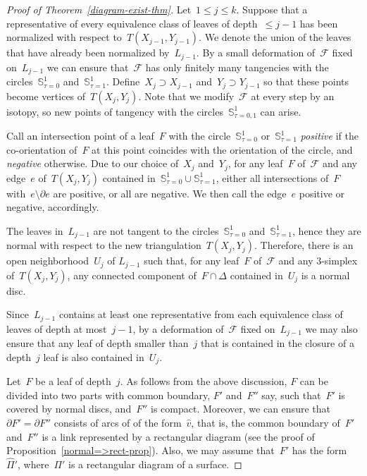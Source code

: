 \documentclass{amsart}
\theoremstyle{theorem}
\theoremstyle{remark}
\theoremstyle{definition}
\numberwithin{equation}{section}
\numberwithin{figure}{section}
\begin{document}
\begin{proof}[Proof of Theorem~\ref{diagram-exist-thm}]
Let~$1\leqslant j\leqslant k$.
Suppose that a representative of every equivalence class of leaves of depth~$\leqslant j-1$
has been normalized with respect to~$T(X_{j-1},Y_{j-1})$. We denote the union of the leaves
that have already been normalized
by~$L_{j-1}$. By a small deformation of~$\mathscr F$ fixed on~$L_{j-1}$ we can ensure
that~$\mathscr F$ has only finitely many tangencies with the circles~$\mathbb S^1_{\tau=0}$
and~$\mathbb S^1_{\tau=1}$. Define~$X_j\supset X_{j-1}$ and~$Y_j\supset Y_{j-1}$ so that these
points become vertices of~$T(X_j,Y_j)$. Note that we modify~$\mathscr F$ at every step by an isotopy,
so new points of tangency with the circles~$\mathbb S^1_{\tau=0,1}$ can arise.

Call an intersection point of a leaf~$F$ with the circle~$\mathbb S^1_{\tau=0}$ or~$\mathbb S^1_{\tau=1}$
\emph{positive} if the co-orientation of~$F$ at this point coincides
with the orientation of the circle, and \emph{negative} otherwise. Due to our choice of~$X_j$ and~$Y_j$,
for any leaf~$F$ of~$\mathscr F$ and any edge~$e$ of~$T(X_j,Y_j)$
contained in~$\mathbb S^1_{\tau=0}\cup\mathbb S^1_{\tau=1}$, either all intersections of~$F$ with~$e\setminus\partial e$ are positive, or all are negative. We then call the edge~$e$ positive or negative, accordingly.

The leaves in~$L_{j-1}$ are not tangent to the circles~$\mathbb S^1_{\tau=0}$ and~$\mathbb S^1_{\tau=1}$,
hence they are normal with respect to the new triangulation~$T(X_j,Y_j)$. Therefore,
there is an open neighborhood~$U_j$
of $L_{j-1}$ such that, for any leaf~$F$ of~$\mathscr F$
and any $3$-simplex of~$T(X_j,Y_j)$, any connected component of~$F\cap\Delta$ contained in~$U_j$
is a normal disc.

Since~$L_{j-1}$ contains at least one representative from each equivalence class of leaves of
depth at most~$j-1$, by a deformation of~$\mathscr F$ fixed on~$L_{j-1}$ we may also ensure that any leaf of depth smaller
than~$j$ that is contained in the closure of a depth~$j$ leaf is also contained in~$U_j$.

Let~$F$ be a leaf of depth~$j$. As follows from the above discussion, $F$ can be divided into
two parts with common boundary, $F'$ and~$F''$ say,
such that~$F'$ is covered by normal discs, and~$F''$ is compact. Moreover,
we can ensure that~$\partial F'=\partial F''$
consists of arcs of of the form~$\widehat v$, that is, the common boundary of~$F'$ and~$F''$ is a link
represented by a rectangular diagram (see the proof of Proposition~\ref{normal=>rect-prop}). Also,
we may assume that~$F'$ has the form~$\widehat\Pi'$, where~$\Pi'$ is a rectangular diagram of a surface.


\end{proof}
\end{document}

